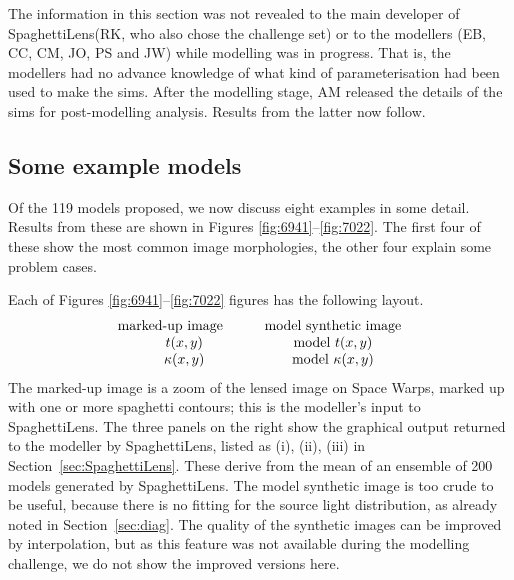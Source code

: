 \documentclass[usenatbib]{mn2e}
\newcommand{\spl}{SpaghettiLens\xspace}
\newcommand{\sw}{Space Warps\xspace}
\newcommand{\secref}[1]{Section~\ref{sec:#1}}
\begin{document}
The information in this section was not revealed to the main developer
of \spl (RK, who also chose the challenge set) or to the modellers
(EB, CC, CM, JO, PS and JW) while modelling was in progress.  That is,
the modellers had no advance knowledge of what kind of
parameterisation had been used to make the sims.  After the modelling
stage, AM released the details of the sims for post-modelling
analysis.  Results from the latter now follow.



\subsection{Some example models} \label{sec:example_models}

Of the 119 models proposed, we now discuss eight examples in some
detail.  Results from these are shown in Figures
\ref{fig:6941}--\ref{fig:7022}.  The first four of these show the most
common image morphologies, the other four explain some problem cases.

Each of Figures \ref{fig:6941}--\ref{fig:7022} figures has the
following layout.
$$ \begin{matrix}
\hbox{marked-up image} \qquad &\hbox{model synthetic image} \\
t(x,y)                        &\hbox{model } t(x,y) \\
\kappa(x,y)                   &\hbox{model } \kappa(x,y)
\end{matrix} $$
The marked-up image is a zoom of the lensed image on \sw,
marked up with one or more spaghetti contours; this is the modeller's
input to \spl.  The three panels on the right show the graphical
output returned to the modeller by \spl, listed as (i), (ii), (iii) in
\secref{SpaghettiLens}.  These derive from the mean of an ensemble of
200 models generated by \spl. The model synthetic image is too crude
to be useful, because there is no fitting for the source light
distribution, as already noted in \secref{diag}.  The quality of the
synthetic images can be improved by interpolation, but as this feature
was not available during the modelling challenge, we do not show the
improved versions here.


\FloatBarrier
\end{document}
